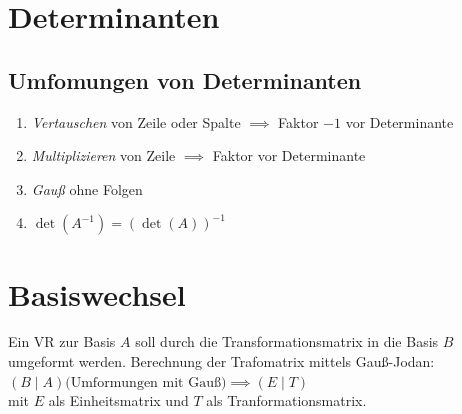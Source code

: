 

\section{Determinanten}
\subsection{Umfomungen von Determinanten}
\begin{enumerate}
    \item \emph{Vertauschen} von Zeile oder Spalte $\implies$ Faktor $-1$ vor Determinante
    \item \emph{Multiplizieren} von Zeile $\implies$ Faktor vor Determinante
    \item \emph{Gauß} ohne Folgen
    \item $\det(A^{-1})=(\det(A))^{-1}$
\end{enumerate}

\section{Basiswechsel}
Ein VR zur Basis $A$ soll durch die Transformationsmatrix in die Basis $B$ umgeformt werden.
Berechnung der Trafomatrix mittels Gauß-Jodan:\\
$(B\mid A) \text{(Umformungen mit Gauß)} \implies  (E\mid T)$ \\ mit $E$ als Einheitsmatrix und $T$ als Tranformationsmatrix.
